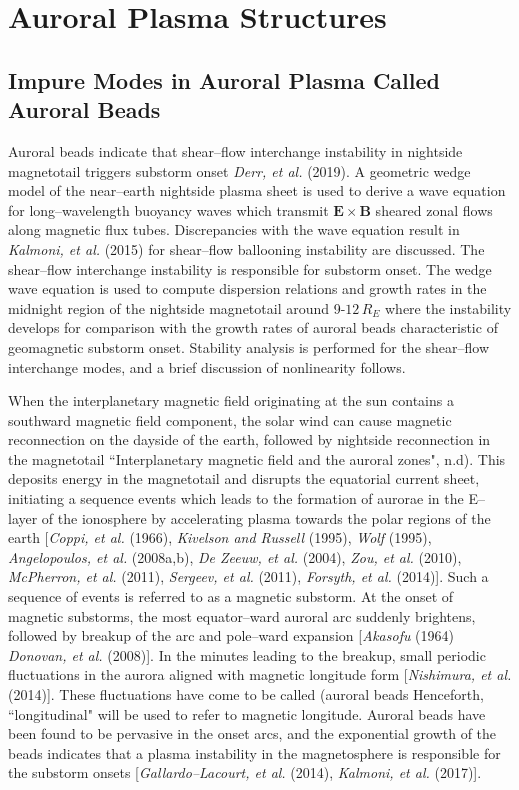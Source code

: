 \documentclass[a4paper,openany,12pt]{book}
\begin{document}

\chapter{Auroral Plasma Structures}

\section{Impure Modes in Auroral Plasma Called Auroral Beads}

Auroral beads indicate that shear--flow interchange instability in nightside magnetotail triggers substorm onset 
\emph{Derr, et al.} (2019). A geometric wedge model of the near--earth nightside plasma sheet is used to derive a wave equation for long--wavelength buoyancy waves which transmit $\bm{E\times B}$ sheared zonal flows along magnetic flux tubes. Discrepancies with the wave equation result in \emph{Kalmoni, et al.} (2015) for shear--flow ballooning instability are discussed. The shear--flow interchange instability is responsible for substorm onset. The wedge wave equation is used to compute dispersion relations and growth rates in the midnight region of the nightside magnetotail around 9-$12\,R_E$ where the instability develops for comparison with the growth rates of auroral beads characteristic of geomagnetic substorm onset. Stability analysis is performed for the shear--flow interchange modes, and a brief discussion of nonlinearity follows.

When the interplanetary magnetic field originating at the sun contains a southward magnetic field component, the solar wind can cause magnetic reconnection on the dayside of the earth, followed by nightside reconnection in the magnetotail ``Interplanetary magnetic field and the auroral zones", n.d). This deposits energy in the magnetotail and disrupts the equatorial current sheet, initiating a sequence events which leads to the formation of aurorae in the E--layer of the ionosphere by accelerating plasma towards the polar regions of the earth [\emph{Coppi, et al.} (1966), \emph{Kivelson and Russell} (1995), \emph{Wolf} (1995), \emph{Angelopoulos, et al.} (2008a,b), \emph{De Zeeuw, et al.} (2004), \emph{Zou, et al.} (2010), \emph{McPherron, et al.} (2011), \emph{Sergeev, et al.} (2011), \emph{Forsyth, et al.} (2014)]. Such a sequence of events is referred to as a magnetic substorm. At the onset of magnetic substorms, the most equator--ward auroral arc suddenly brightens, followed by breakup of the arc and pole--ward expansion [\emph{Akasofu} (1964) \emph{Donovan, et al.} (2008)]. In the minutes leading to the breakup, small periodic fluctuations in the aurora aligned with magnetic longitude form [\emph{Nishimura, et al.} (2014)]. These fluctuations have come to be called (auroral beads Henceforth, ``longitudinal" will be used to refer to magnetic longitude. Auroral beads have been found to be pervasive in the onset arcs, and the exponential growth of the beads indicates that a plasma instability in the magnetosphere is responsible for the substorm onsets [\emph{Gallardo--Lacourt, et al.} (2014), \emph{Kalmoni, et al.} (2017)].
\end{document}
